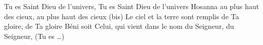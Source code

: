 Tu es Saint Dieu de l’univers, Tu es Saint Dieu de l’univers
Hosanna au plus haut des cieux, au plus haut des cieux (bis) Le ciel et la terre sont remplis de Ta gloire, de Ta gloire Béni soit Celui, qui vient dans le nom du Seigneur, du Seigneur, (Tu es \dots ) 
